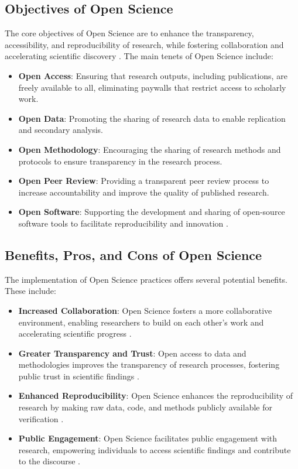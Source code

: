 \documentclass[final]{rc-book-2.14}
\begin{document}
\subsection{Objectives of Open Science}
The core objectives of Open Science are to enhance the transparency, accessibility, and reproducibility of research, while fostering collaboration and accelerating scientific discovery \cite{Leonelli2016}. The main tenets of Open Science include:
\begin{itemize}
    \item \textbf{Open Access}: Ensuring that research outputs, including publications, are freely available to all, eliminating paywalls that restrict access to scholarly work.
    \item \textbf{Open Data}: Promoting the sharing of research data to enable replication and secondary analysis.
    \item \textbf{Open Methodology}: Encouraging the sharing of research methods and protocols to ensure transparency in the research process.
    \item \textbf{Open Peer Review}: Providing a transparent peer review process to increase accountability and improve the quality of published research.
    \item \textbf{Open Software}: Supporting the development and sharing of open-source software tools to facilitate reproducibility and innovation \cite{Piwowar2011}.
\end{itemize}

\subsection{Benefits, Pros, and Cons of Open Science}
The implementation of Open Science practices offers several potential benefits. These include:
\begin{itemize}
    \item \textbf{Increased Collaboration}: Open Science fosters a more collaborative environment, enabling researchers to build on each other's work and accelerating scientific progress \cite{Borgman2012}.
    \item \textbf{Greater Transparency and Trust}: Open access to data and methodologies improves the transparency of research processes, fostering public trust in scientific findings \cite{Boulton2015}.
    \item \textbf{Enhanced Reproducibility}: Open Science enhances the reproducibility of research by making raw data, code, and methods publicly available for verification \cite{Nosek2015}.
    \item \textbf{Public Engagement}: Open Science facilitates public engagement with research, empowering individuals to access scientific findings and contribute to the discourse \cite{Leonelli2016}.
\end{itemize}
\end{document}
